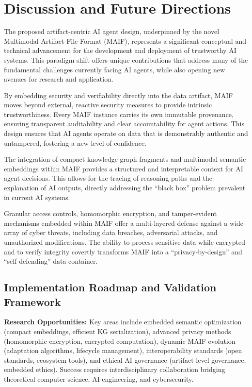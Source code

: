 \documentclass[conference]{IEEEtran}
\begin{document}
\section{Discussion and Future Directions}
\label{sec:discussion}

The proposed artifact-centric AI agent design, underpinned by the novel Multimodal Artifact File Format (MAIF), represents a significant conceptual and technical advancement for the development and deployment of trustworthy AI systems. This paradigm shift offers unique contributions that address many of the fundamental challenges currently facing AI agents, while also opening new avenues for research and application.

By embedding security and verifiability directly into the data artifact, MAIF moves beyond external, reactive security measures to provide intrinsic trustworthiness. Every MAIF instance carries its own immutable provenance, ensuring transparent auditability and clear accountability for agent actions\cite{ref4}. This design ensures that AI agents operate on data that is demonstrably authentic and untampered, fostering a new level of confidence.

The integration of compact knowledge graph fragments and multimodal semantic embeddings within MAIF provides a structured and interpretable context for AI agent decisions\cite{ref26}. This allows for the tracing of reasoning paths and the explanation of AI outputs, directly addressing the ``black box'' problem prevalent in current AI systems\cite{ref4}.

Granular access controls, homomorphic encryption, and tamper-evident mechanisms embedded within MAIF offer a multi-layered defense against a wide array of cyber threats, including data breaches, adversarial attacks, and unauthorized modifications\cite{ref69}. The ability to process sensitive data while encrypted and to verify integrity covertly transforms MAIF into a ``privacy-by-design'' and ``self-defending'' data container.


\subsection{Implementation Roadmap and Validation Framework}

\textbf{Research Opportunities:} Key areas include embedded semantic optimization (compact embeddings, efficient KG serialization), advanced privacy methods (homomorphic encryption, encrypted computation), dynamic MAIF evolution (adaptation algorithms, lifecycle management), interoperability standards (open standards, ecosystem tools), and ethical AI governance (artifact-level governance, embedded ethics). Success requires interdisciplinary collaboration bridging theoretical computer science, AI engineering, and cybersecurity.
\end{document}
